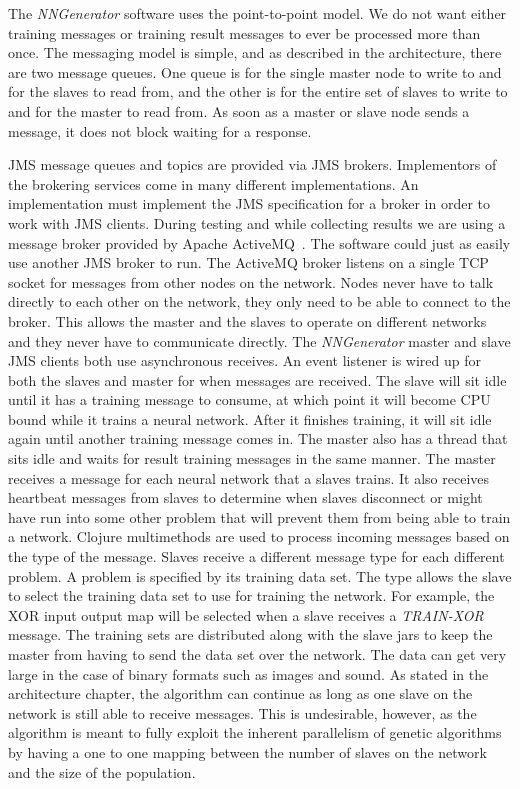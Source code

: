 The {\em NNGenerator} software uses the point-to-point model.
We do not want either training messages or training result messages to ever be processed more than once.
The messaging model is simple, and as described in the architecture, there are two message queues. 
One queue is for the single master node to write to and for the slaves to read from, and the other is for the entire set of slaves to write to and for the master to read from. 
As soon as a master or slave node sends a message, it does not block waiting for a response. 

JMS message queues and topics are provided via JMS brokers.
Implementors of the brokering services come in many different implementations. 
An implementation must implement the JMS specification for a broker in order to work with JMS clients.
During testing and while collecting results we are using a message broker provided by Apache ActiveMQ~\cite{activeMQ}.
The software could just as easily use another JMS broker to run. 
The ActiveMQ broker listens on a single TCP socket for messages from other nodes on the network. 
Nodes never have to talk directly to each other on the network, they only need to be able to connect to the broker. 
This allows the master and the slaves to operate on different networks and they never have to communicate directly.
The {\em NNGenerator} master and slave JMS clients both use asynchronous receives.
An event listener is wired up for both the slaves and master for when messages are received. 
The slave will sit idle until it has a training message to consume, at which point it will become CPU bound while it trains a neural network.
After it finishes training, it will sit idle again until another training message comes in.
The master also has a thread that sits idle and waits for result training messages in the same manner.
The master receives a message for each neural network that a slaves trains. 
It also receives heartbeat messages from slaves to determine when slaves disconnect or might have run into some other problem that will prevent them from being able to train a network. 
Clojure multimethods are used to process incoming messages based on the type of the message. 
Slaves receive a different message type for each different problem. A problem is specified by its training data set. 
The type allows the slave to select the training data set to use for training the network. 
For example, the XOR input output map will be selected when a slave receives a {\em TRAIN-XOR} message. 
The training sets are distributed along with the slave jars to keep the master from having to send the data set over the network. 
The data can get very large in the case of binary formats such as images and sound. 
As stated in the architecture chapter, the algorithm can continue as long as one slave on the network is still able to receive messages. 
This is undesirable, however, as the algorithm is meant to fully exploit the inherent parallelism of genetic algorithms by having a one to one mapping between the number of slaves on the network and the size of the population. 

